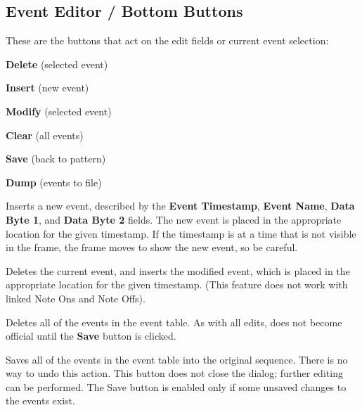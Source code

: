 
\subsection{Event Editor / Bottom Buttons}
\label{subsec:event_editor_buttons}

   These are the buttons that act on the edit fields or current event
   selection:

   \begin{enumber}
      \item \textbf{Delete} (selected event)
      \item \textbf{Insert} (new event)
      \item \textbf{Modify} (selected event)
      \item \textbf{Clear} (all events)
      \item \textbf{Save} (back to pattern)
      \item \textbf{Dump} (events to file)
   \end{enumber}

   \setcounter{ItemCounter}{0}      %

   Inserts a new event, described by the 
   \textbf{Event Timestamp},
   \textbf{Event Name},
   \textbf{Data Byte 1}, and
   \textbf{Data Byte 2} fields.
   The new event is placed in the appropriate location for the given timestamp.
   If the timestamp is at a time that is not visible in the frame, the frame
   moves to show the new event, so be careful.

   Deletes the current event, and inserts the modified event,
   which is placed in the appropriate location for the given
   timestamp.  (This feature does not work with linked Note Ons and Note Offs).

   Deletes all of the events in the event table.
   As with all edits, does not become official until the \textbf{Save} button
   is clicked.

   Saves all of the events in the event table into the original sequence.
   There is no way to undo this action.
   This button does not close the dialog; further
   editing can be performed.  The Save button is enabled only if
   some unsaved changes to the events exist.

